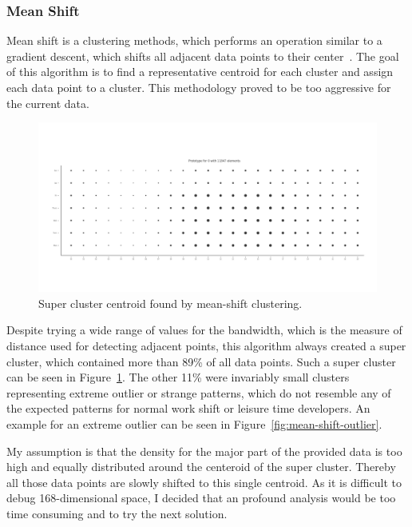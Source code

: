 \subsubsection{Mean Shift}\label{mean-shift}
Mean shift is a clustering methods, which performs an operation similar to a gradient descent, which shifts all adjacent data points to their center~\cite{article:mean-shift}.
The goal of this algorithm is to find a representative centroid for each cluster and assign each data point to a cluster.
This methodology proved to be too aggressive for the current data.

\begin{figure}[H]
    \includegraphics[scale=0.32]{./graphs/analysis-mean-shift/supercluster}
    \centering
    \caption{Super cluster centroid found by mean-shift clustering.}\label{fig:mean-shift-super-cluster}
\end{figure}


Despite trying a wide range of values for the bandwidth, which is the measure of distance used for detecting adjacent points, this algorithm always created a super cluster, which contained more than 89\% of all data points. Such a super cluster can be seen in Figure~\ref{fig:mean-shift-super-cluster}.
The other 11\% were invariably small clusters representing extreme outlier or strange patterns, which do not resemble any of the expected patterns for normal work shift or leisure time developers.
An example for an extreme outlier can be seen in Figure~\ref{fig:mean-shift-outlier}.

My assumption is that the density for the major part of the provided data is too high and equally distributed around the centeroid of the super cluster.
Thereby all those data points are slowly shifted to this single centroid.
As it is difficult to debug 168-dimensional space, I decided that an profound analysis would be too time consuming and to try the next solution.

